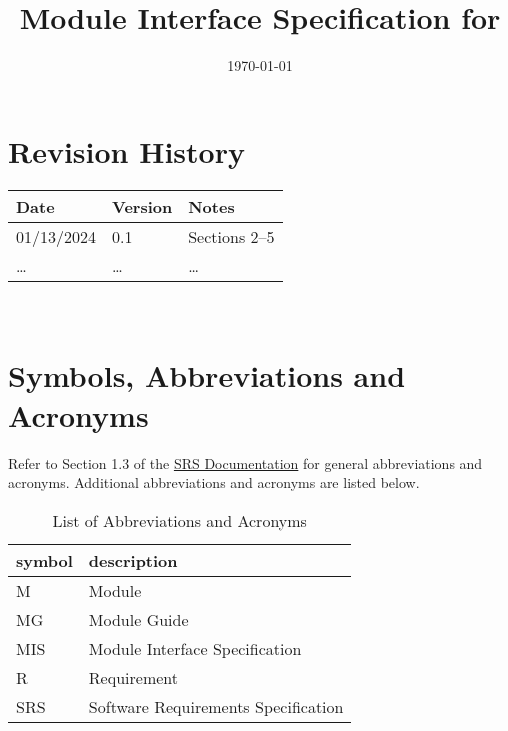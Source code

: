 \documentclass[12pt, titlepage]{article}
\begin{document}
\title{Module Interface Specification for \progname{}}

\author{\authname}

\date{\today}

\maketitle


\section{Revision History}

\begin{tabularx}{\textwidth}{p{3cm}p{2cm}X}
\toprule {\bf Date} & {\bf Version} & {\bf Notes}\\
\midrule
01/13/2024 & 0.1 & Sections 2--5 \\
\ldots & \ldots & \ldots \\
\bottomrule
\end{tabularx}

~\newpage

\section{Symbols, Abbreviations and Acronyms}
Refer to Section 1.3 of the
\href{https://github.com/PlutosCapstone/Plutos/blob/main/docs/SRS/SRS.pdf}{SRS
Documentation} for general abbreviations and acronyms. Additional abbreviations
and acronyms are listed below.


\renewcommand{\arraystretch}{1.2}
\begin{table}[H]
\caption{List of Abbreviations and Acronyms}
\centering
\begin{tabularx}{\textwidth}{l X} 
	\toprule		
	\textbf{symbol} & \textbf{description}\\
	\midrule 
	M & Module \\
	MG & Module Guide \\
  MIS & Module Interface Specification\\
	R & Requirement\\
	SRS & Software Requirements Specification\\
	\bottomrule
\end{tabularx}
\end{table}

\newpage

\tableofcontents
\end{document}
